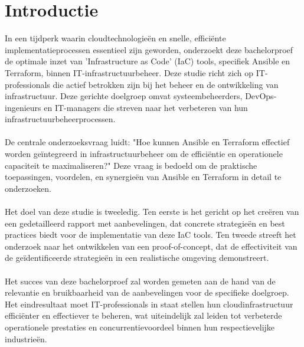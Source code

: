 
\section{Introductie}%
\label{sec:introductie}

In een tijdperk waarin cloudtechnologieën en snelle, efficiënte implementatieprocessen essentieel zijn geworden, onderzoekt deze bachelorproef de optimale inzet van 'Infrastructure as Code' (IaC) tools, specifiek Ansible en Terraform, binnen IT-infrastructuurbeheer. Deze studie richt zich op IT-professionals die actief betrokken zijn bij het beheer en de ontwikkeling van infrastructuur. Deze gerichte doelgroep omvat systeembeheerders, DevOps-ingenieurs en IT-managers die streven naar het verbeteren van hun infrastructuurbeheerprocessen. \\\\

De centrale onderzoeksvraag luidt: "Hoe kunnen Ansible en Terraform effectief worden geïntegreerd in infrastructuurbeheer om de efficiëntie en operationele capaciteit te maximaliseren?" Deze vraag is bedoeld om de praktische toepassingen, voordelen, en synergieën van Ansible en Terraform in detail te onderzoeken. \\\\

Het doel van deze studie is tweeledig. Ten eerste is het gericht op het creëren van een gedetailleerd rapport met aanbevelingen, dat concrete strategieën en best practices biedt voor de implementatie van deze IaC tools. Ten tweede streeft het onderzoek naar het ontwikkelen van een proof-of-concept, dat de effectiviteit van de geïdentificeerde strategieën in een realistische omgeving demonstreert. \\\\

Het succes van deze bachelorproef zal worden gemeten aan de hand van de relevantie en bruikbaarheid van de aanbevelingen voor de specifieke doelgroep. Het eindresultaat moet IT-professionals in staat stellen hun cloudinfrastructuur efficiënter en effectiever te beheren, wat uiteindelijk zal leiden tot verbeterde operationele prestaties en concurrentievoordeel binnen hun respectievelijke industrieën. \\\\


